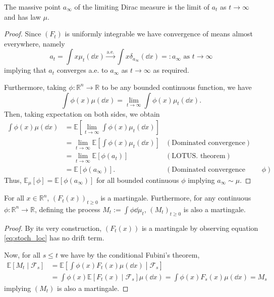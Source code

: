 \begin{corollary}\label{cor:lim_dis}
  The massive point \(a_\infty\) of the limiting Dirac measure is the limit of \(a_t\) as 
  \(t \to \infty\) and has law \(\mu\).
\end{corollary}
\begin{proof}
  Since \((F_t)\) is uniformly integrable we have convergence of means almost everywhere, namely
  \[a_t = \int x \mu_t(\dd x) \xrightarrow{\text{a.e.}} \int x \delta_{a_\infty}(\dd x) =: a_\infty \text{ as } t \to \infty\]
  implying that \(a_t\) converges a.e. to \(a_\infty\) as \(t \to \infty\) as required. 
  
  Furthermore, taking \(\phi : \mathbb{R}^n \to \mathbb{R}\) to be any bounded continuous function, we have
  \[\int \phi(x) \mu(\dd x) = \lim_{t \to \infty} \int \phi(x) \mu_t(\dd x).\]
  Then, taking expectation on both sides, we obtain
  \begin{align*}
    \int \phi(x) \mu(\dd x) & = \mathbb{E}\left[\lim_{t \to \infty} \int \phi(x) \mu_t(\dd x)\right] & \\
    & = \lim_{t \to \infty} \mathbb{E}\left[\int \phi(x) \mu_t(\dd x)\right] & (\text{Dominated convergence})\\
    & = \lim_{t \to \infty} \mathbb{E}[\phi(a_t)] & (\text{LOTUS. theorem})\\
    & = \mathbb{E}[\phi(a_\infty)]. & (\text{Dominated convergence \& continuity of } \phi)
  \end{align*}
  Thus, \(\mathbb{E}_\mu[\phi] = \mathbb{E}[\phi(a_\infty)]\) for all bounded continuous \(\phi\) implying 
  \(a_\infty \sim \mu\).
\end{proof}

\begin{proposition}
  For all \(x \in \mathbb{R}^n\), \((F_t(x))_{t \ge 0}\) is a martingale. Furthermore, for any 
  continuous \(\phi : \mathbb{R}^n \to \mathbb{R}\), defining the process 
  \(M_t := \int \phi \dd \mu_t\), \((M_t)_{t \ge 0}\) is also a martingale.
\end{proposition}
\begin{proof}
  By its very construction, \((F_t(x))\) is a martingale by observing equation \ref{eq:stoch_loc} has no 
  drift term.
  
  Now, for all \(s \le t\) we have by the conditional Fubini's theorem,
  \begin{align*}
    \mathbb{E}[M_t \mid \mathscr{F}_s] 
    & = \mathbb{E}\left[\int \phi(x) F_t(x) \mu(\dd x) \middle\vert \mathscr{F}_s\right]\\
    & = \int \phi(x) \mathbb{E}[F_t(x) \mid \mathscr{F}_s] \mu(\dd x) 
    = \int \phi(x) F_s(x) \mu(\dd x)
    = M_s
  \end{align*}
  implying \((M_t)\) is also a martingale.
\end{proof}

